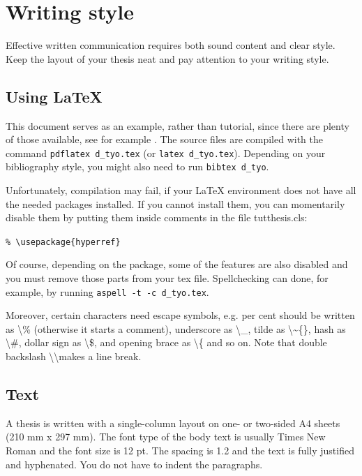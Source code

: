 \documentclass[12pt,a4paper,english
]{tunithesis}
\begin{document}
\chapter{Writing style}
\label{ch:style}

Effective written communication requires both sound content and clear
style. Keep the layout of your thesis neat and pay attention to your
writing style.

\section{Using LaTeX}

This document serves as an example, rather than tutorial, since there
are plenty of those available, see for example 
\cite{mittelbach04,oetiker14, latex13}. The source files are compiled
with the command \texttt{pdflatex d\_tyo.tex} (or \texttt{latex
  d\_tyo.tex}). Depending on your bibliography style, you might also
need to run \texttt{bibtex d\_tyo}.

Unfortunately, compilation may fail, if your LaTeX environment does
not have all the needed packages installed. If you cannot install
them, you can momentarily disable them by putting them inside comments
in the file tutthesis.cls:
\begin{center}
\texttt{\% \textbackslash usepackage\{hyperref\}}
\end{center}
Of course, depending on the package, some of the features are also
disabled and you must remove those parts from your tex file.
Spellchecking can done, for example, by running 
\texttt{aspell -t -c d\_tyo.tex}.

Moreover, certain characters need escape symbols, e.g. per cent should
be written as \textbackslash\% (otherwise it starts a comment),
underscore as \textbackslash\_, tilde as \textbackslash\~{}\{\}, hash
as \textbackslash\#, dollar sign as \textbackslash\$, and opening
brace as \textbackslash\{ and so on. Note that double backslash
\textbackslash\textbackslash makes a line break.

\section{Text}
A thesis is written with a single-column layout on one- or two-sided
A4 sheets (210 mm x 297 mm). The font type of the body text is usually
Times New Roman and the font size is 12 pt. The spacing is 1.2 and the
text is fully justified and hyphenated. You do not have to indent the
paragraphs.
\end{document}
